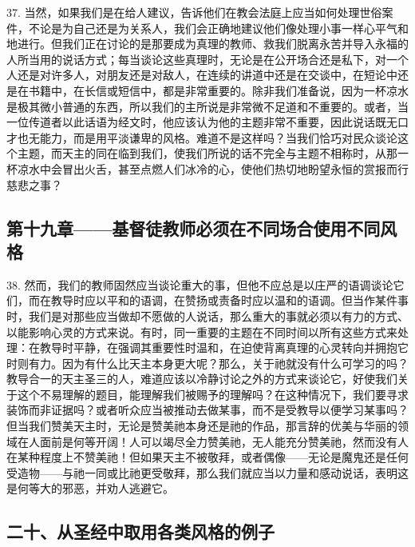 37. 当然，如果我们是在给人建议，告诉他们在教会法庭上应当如何处理世俗案件，不论是为自己还是为关系人，我们会正确地建议他们像处理小事一样心平气和地进行。但我们正在讨论的是那要成为真理的教师、救我们脱离永苦并导入永福的人所当用的说话方式；每当谈论这些真理时，无论是在公开场合还是私下，对一个人还是对许多人，对朋友还是对敌人，在连续的讲道中还是在交谈中，在短论中还是在书籍中，在长信或短信中，都是非常重要的。除非我们准备说，因为一杯凉水是极其微小普通的东西，所以我们的主所说是非常微不足道和不重要的。或者，当一位传道者以此话语为经文时，他应该认为他的主题非常不重要，因此说话既无口才也无能力，而是用平淡谦卑的风格。难道不是这样吗？当我们恰巧对民众谈论这个主题，而天主的同在临到我们，使我们所说的话不完全与主题不相称时，从那一杯凉水中会冒出火舌，甚至点燃人们冰冷的心，使他们热切地盼望永恒的赏报而行慈悲之事？\par


\subsection{第十九章——基督徒教师必须在不同场合使用不同风格}

38. 然而，我们的教师固然应当谈论重大的事，但他不应总是以庄严的语调谈论它们，而在教导时应以平和的语调，在赞扬或责备时应以温和的语调。但当作某件事时，我们是对那些应当做却不愿做的人说话，那么重大的事就必须以有力的方式、以能影响心灵的方式来说。有时，同一重要的主题在不同时间以所有这些方式来处理：在教导时平静，在强调其重要性时温和，在迫使背离真理的心灵转向并拥抱它时则有力。因为有什么比天主本身更大呢？那么，关于祂就没有什么可学习的吗？教导合一的天主圣三的人，难道应该以冷静讨论之外的方式来谈论它，好使我们关于这个不易理解的题目，能理解我们被赐予的理解吗？在这种情况下，我们要寻求装饰而非证据吗？或者听众应当被推动去做某事，而不是受教导以便学习某事吗？但当我们赞美天主时，无论是赞美祂本身还是祂的作品，那言辞的优美与华丽的领域在人面前是何等开阔！人可以竭尽全力赞美祂，无人能充分赞美祂，然而没有人在某种程度上不赞美祂！但如果天主不被敬拜，或者偶像——无论是魔鬼还是任何受造物——与祂一同或比祂更受敬拜，那么我们就应当以力量和感动说话，表明这是何等大的邪恶，并劝人逃避它。\par


\subsection{二十、从圣经中取用各类风格的例子}

